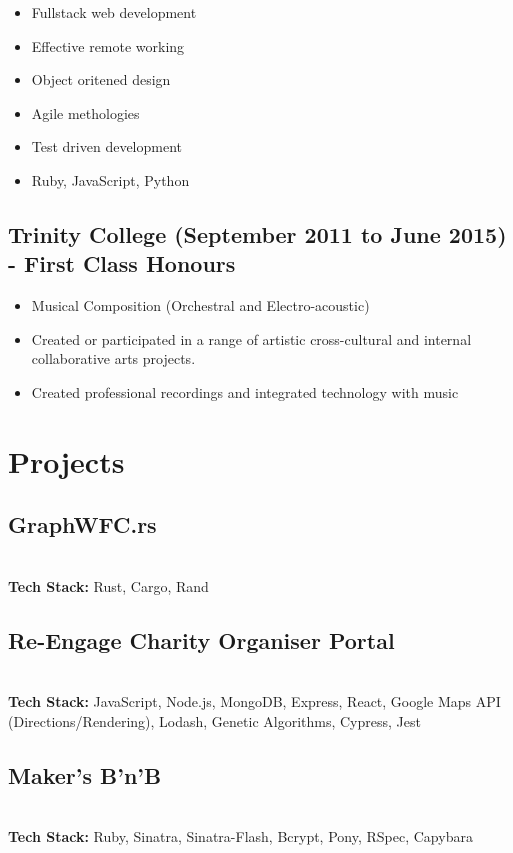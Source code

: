 \documentclass[12pt]{IEEEtran}
\begin{document}
\begin{itemize}
\item Fullstack web development
\item Effective remote working
\item Object oritened design
\item Agile methologies
\item Test driven development
\item Ruby, JavaScript, Python
\end{itemize}

\subsection*{Trinity College (September 2011 to June 2015) - First Class Honours}
\begin{itemize}
\item Musical Composition (Orchestral and Electro-acoustic)
\item Created or participated in a range of artistic cross-cultural and internal collaborative arts projects.
\item Created professional recordings and integrated technology with music
\end{itemize}

\vskip 1in

\section*{Projects}
\subsection*{GraphWFC.rs}
 \\[5pt]
\textbf{Tech Stack:} Rust, Cargo, Rand

\subsection*{Re-Engage Charity Organiser Portal}
 \\[5pt]
\textbf{Tech Stack:} JavaScript, Node.js, MongoDB, Express, React, Google Maps API (Directions/Rendering), Lodash, Genetic Algorithms, Cypress, Jest

\subsection*{Maker's B'n'B}
 \\
\textbf{Tech Stack:} Ruby, Sinatra, Sinatra-Flash, Bcrypt, Pony, RSpec, Capybara \\[3pt]
\end{document}

